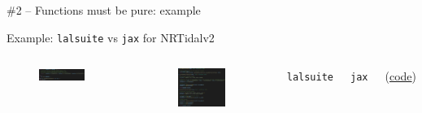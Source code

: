 \documentclass[usenames,dvipsnames,t]{beamer}
\begin{document}
\begin{frame}{\#2 -- Functions must be pure: example}

  Example: \texttt{lalsuite} vs \texttt{jax} for NRTidalv2

  \vspace{-2mm}

  \begin{columns}

    \begin{figure}[H]
      \centering
      \includegraphics[width=0.8\textwidth]{Figures/lalsuite_code.png}
    \end{figure}
  
    \begin{figure}[H]
      \centering
      \includegraphics[width=0.8\textwidth]{Figures/ripple_code.png}
    \end{figure}
  

    \vspace{1cm}

    \texttt{lalsuite} 

    \vspace{3cm}

    \texttt{jax} 

    (\href{https://github.com/ThibeauWouters/ripple/blob/main/src/ripple/waveforms/utils_tidal.py}{code})
  
  \end{columns}

\end{frame}
\end{document}
